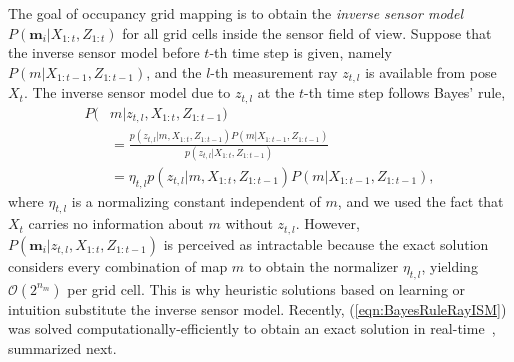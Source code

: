 \documentclass[letterpaper, 10pt, conference]{ieeeconf}
\newcommand{\refeqn}[1]{(\ref{eqn:#1})}
\begin{document}
The goal of occupancy grid mapping is to obtain the \emph{inverse sensor model} $P(\mathbf{m}_i|X_{1:t},Z_{1:t})$ for all grid cells inside the sensor field of view.
Suppose that the inverse sensor model before $t$-th time step is given, namely $P(m|X_{1:t-1},Z_{1:t-1})$, and the $l$-th measurement ray $z_{t,l}$ is available from pose $X_t$.
The inverse sensor model due to $z_{t,l}$ at the $t$-th time step follows Bayes' rule,
\begin{align}
\label{eqn:BayesRuleRayISM}
P(&m|z_{t,l},X_{1:t},Z_{1:t-1})\nonumber
\\
&=\frac{p(z_{t,l}|m,X_{1:t},Z_{1:t-1})P(m|X_{1:t-1},Z_{1:t-1})}{p(z_{t,l}|X_{1:t},Z_{1:t-1})}\nonumber
\\
&=\eta_{t,l}p(z_{t,l}|m,X_{1:t},Z_{1:t-1})P(m|X_{1:t-1},Z_{1:t-1}),
\end{align}
where $\eta_{t,l}$ is a normalizing constant independent of $m$, and we used the fact that $X_t$ carries no information about $m$ without $z_{t,l}$. However, $P(\mathbf{m}_i|z_{t,l},X_{1:t},Z_{1:t-1})$ is perceived as intractable because the exact solution considers every combination of map $m$ to obtain the normalizer $\eta_{t,l}$, yielding $\mathcal O(2^{n_m})$ per grid cell. This is why heuristic solutions based on learning or intuition substitute the inverse sensor model. Recently, \refeqn{BayesRuleRayISM} was solved computationally-efficiently to obtain an exact solution in real-time~\cite{KauLeeAiMos16}, summarized next.
\end{document}
